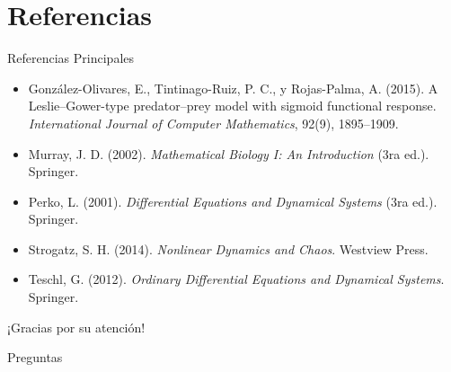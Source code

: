 \documentclass[aspectratio=169]{beamer}
\theoremstyle{definition}
\begin{document}
	\section{Referencias}
	
	\begin{frame}{Referencias Principales}
		\footnotesize
		\begin{itemize}
			\item González-Olivares, E., Tintinago-Ruiz, P. C., y Rojas-Palma, A. (2015). A Leslie–Gower-type predator–prey model with sigmoid functional response. \textit{International Journal of Computer Mathematics}, 92(9), 1895--1909.
			\item Murray, J. D. (2002). \textit{Mathematical Biology I: An Introduction} (3ra ed.). Springer.
			\item Perko, L. (2001). \textit{Differential Equations and Dynamical Systems} (3ra ed.). Springer.
			\item Strogatz, S. H. (2014). \textit{Nonlinear Dynamics and Chaos}. Westview Press.
			\item Teschl, G. (2012). \textit{Ordinary Differential Equations and Dynamical Systems}. Springer.			
		\end{itemize}
	\end{frame}
	
	\begin{frame}[plain]
		\begin{center}
			\Huge ¡Gracias por su atención!
			
			\vspace{1cm}
			
			\Large Preguntas
		\end{center}
	\end{frame}
	
\end{document}
